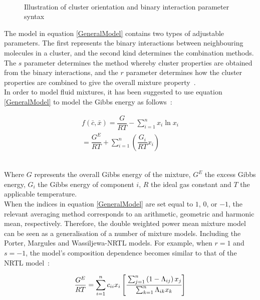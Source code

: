 \begin{figure}[t]
\begin{center}
\resizebox{0.7\textwidth}{!}{}\\
\end{center}
\caption{Illustration of cluster orientation and binary interaction parameter syntax} \label{BinaryParameterSyntaxDrawing}
\end{figure}	

The model in equation \ref{GeneralModel} contains two types of adjustable parameters. The first  represents the binary interactions between neighbouring molecules in a cluster, and the second kind determines the combination methods. The $s$ parameter determines the method whereby cluster properties are obtained from the binary interactions, and the $r$ parameter determines how the cluster properties are combined to give the overall mixture property~\cite{WeightedPowerMeanModel, FockeSandrock}.\\

In order to model fluid mixtures, it has been suggested to use equation \ref{GeneralModel} to model the Gibbs energy as follows~\cite{WeightedPowerMeanModel}:\

\begin{eqnarray}
f\left( \bar{c}, \bar{x}\right) = \dfrac{G}{RT} - \sum_{i=1}^{n} x_{i}\ln x_{i}\\
= \dfrac{G^{E}}{RT} + \sum_{i=1}^{n}\left(\dfrac{G_{i}}{RT}x_{i}\right) \label{GeneralPowerMeanGibbsModel}
\end{eqnarray}\

Where $G$ represents the overall Gibbs energy of the mixture, $G^{E}$ the excess Gibbs energy, $G_{i}$ the Gibbs energy of component $i$, $R$ the ideal gas constant and $T$ the applicable temperature.\\

When the indices in equation \ref{GeneralModel} are set equal to $1$, $0$, or $-1$, the relevant averaging method corresponds to an arithmetic, geometric and harmonic mean, respectively. Therefore, the double weighted power mean mixture model can be seen as a generalisation of a number of mixture models. Including the Porter, Margules and Wassiljewa-NRTL models. For example, when $r = 1$ and $s = -1$, the model's composition dependence becomes similar to that of the NRTL model~\cite{WeightedPowerMeanModel}:\

\begin{equation}
\dfrac{G^{E}}{RT} = \sum_{i=1}^{n} c_{ii}x_{i}\left[\cfrac{\sum_{j=1}^{n}\left(1-\Lambda_{ij}\right)x_{j}}{\sum_{k=1}^{n}\Lambda_{ik}x_{k}}\right] \label{DWPMasNRTL}
\end{equation}\

